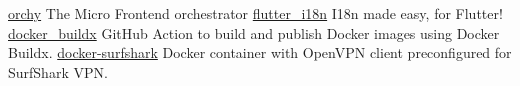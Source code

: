 \vspace{2mm}
\vspace{1mm}

\vspace{1mm}
\cvachievement
{\faBolt}
{\href{https://github.com/orchy-mfe}{orchy}}
{The Micro Frontend orchestrator}
\vspace{2mm}
\divider
\cvachievement
{\faFlag}
{\href{https://github.com/ilteoood/flutter_i18n}{flutter\_i18n}}
{I18n made easy, for Flutter!}
\vspace{2mm}
\divider
\cvachievement
{\faGithub}
{\href{https://github.com/ilteoood/docker_buildx}{docker\_buildx}}
{GitHub Action to build and publish Docker images using Docker Buildx.}
\divider
\cvachievement
{\faConnectdevelop}
{\href{https://github.com/ilteoood/docker-surfshark}{docker-surfshark}}
{Docker container with OpenVPN client preconfigured for SurfShark VPN.}
